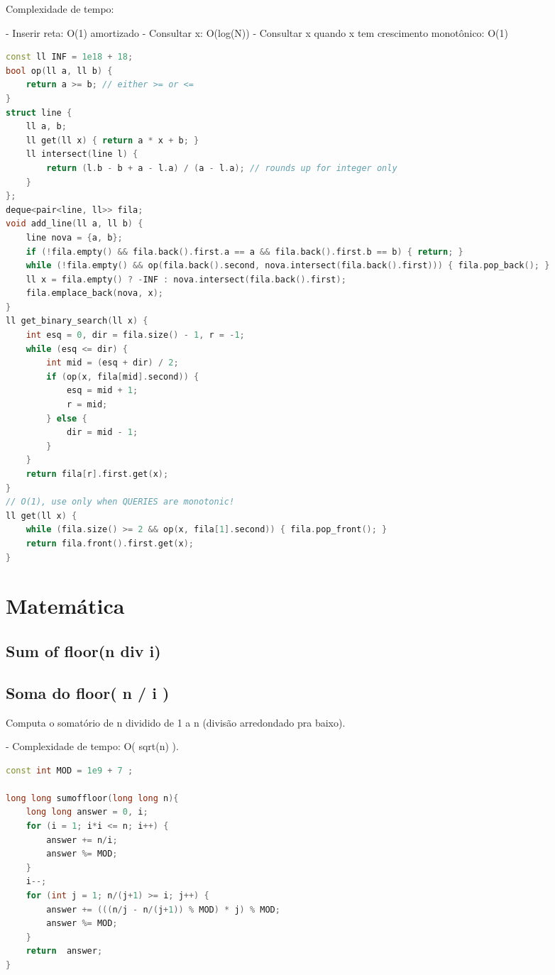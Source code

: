 \documentclass[11pt, a4paper, twoside]{article}
\begin{document}
Complexidade de tempo:

- Inserir reta: O(1) amortizado
- Consultar x: O(log(N))
- Consultar x quando x tem crescimento monotônico: O(1)

\begin{lstlisting}[language=C++]
const ll INF = 1e18 + 18;
bool op(ll a, ll b) {
    return a >= b; // either >= or <=
}
struct line {
    ll a, b;
    ll get(ll x) { return a * x + b; }
    ll intersect(line l) {
        return (l.b - b + a - l.a) / (a - l.a); // rounds up for integer only
    }
};
deque<pair<line, ll>> fila;
void add_line(ll a, ll b) {
    line nova = {a, b};
    if (!fila.empty() && fila.back().first.a == a && fila.back().first.b == b) { return; }
    while (!fila.empty() && op(fila.back().second, nova.intersect(fila.back().first))) { fila.pop_back(); }
    ll x = fila.empty() ? -INF : nova.intersect(fila.back().first);
    fila.emplace_back(nova, x);
}
ll get_binary_search(ll x) {
    int esq = 0, dir = fila.size() - 1, r = -1;
    while (esq <= dir) {
        int mid = (esq + dir) / 2;
        if (op(x, fila[mid].second)) {
            esq = mid + 1;
            r = mid;
        } else {
            dir = mid - 1;
        }
    }
    return fila[r].first.get(x);
}
// O(1), use only when QUERIES are monotonic!
ll get(ll x) {
    while (fila.size() >= 2 && op(x, fila[1].second)) { fila.pop_front(); }
    return fila.front().first.get(x);
}
\end{lstlisting}

\newpage
%
%
%
%

\section{Matemática}

\subsection{Sum of floor(n div i)}


\subsection{Soma do floor( n / i )}



Computa o somatório de n dividido de 1 a n (divisão arredondado pra baixo).

- Complexidade de tempo: O( sqrt(n) ).

\begin{multicols}{2}
\begin{lstlisting}[language=C++]
const int MOD = 1e9 + 7 ;

long long sumoffloor(long long n){
    long long answer = 0, i;
    for (i = 1; i*i <= n; i++) {
        answer += n/i;
        answer %= MOD;
    }
    i--;
    for (int j = 1; n/(j+1) >= i; j++) {
        answer += (((n/j - n/(j+1)) % MOD) * j) % MOD;
        answer %= MOD;
    }
    return  answer;
}
\end{lstlisting}
\end{multicols}
\end{document}
